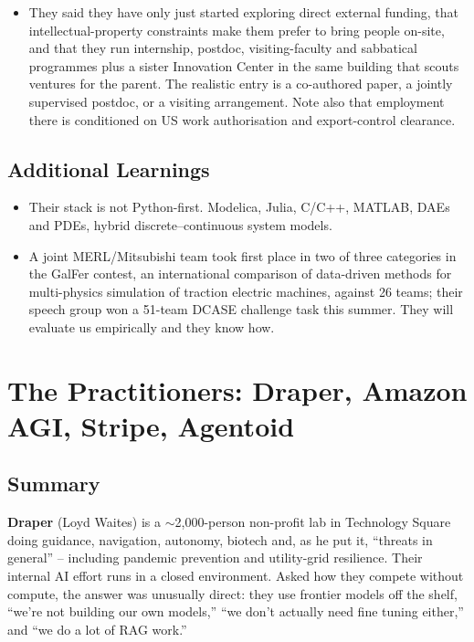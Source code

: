 \documentclass[11pt]{article}
\begin{document}
\begin{itemize}
    \item They said they have only just started exploring direct external funding, that intellectual-property constraints make them prefer to bring people on-site, and that they run internship, postdoc, visiting-faculty and sabbatical programmes plus a sister Innovation Center in the same building that scouts ventures for the parent. The realistic entry is a co-authored paper, a jointly supervised postdoc, or a visiting arrangement. Note also that employment there is conditioned on US work authorisation and export-control clearance.
\end{itemize}

\subsection*{Additional Learnings}
\begin{itemize}
    \item Their stack is not Python-first. Modelica, Julia, C/C++, MATLAB, DAEs and PDEs, hybrid discrete--continuous system models.
    \item A joint MERL/Mitsubishi team took first place in two of three categories in the GalFer contest, an international comparison of data-driven methods for multi-physics simulation of traction electric machines, against 26 teams; their speech group won a 51-team DCASE challenge task this summer. They will evaluate us empirically and they know how.
\end{itemize}

\section{The Practitioners: Draper, Amazon AGI, Stripe, Agentoid}

\subsection*{Summary}
\textbf{Draper} (Loyd Waites) is a $\sim$2{,}000-person non-profit lab in Technology Square doing guidance, navigation, autonomy, biotech and, as he put it, ``threats in general'' -- including pandemic prevention and utility-grid resilience. Their internal AI effort runs in a closed environment. Asked how they compete without compute, the answer was unusually direct: they use frontier models off the shelf, ``we're not building our own models,'' ``we don't actually need fine tuning either,'' and ``we do a lot of RAG work.''
\end{document}
